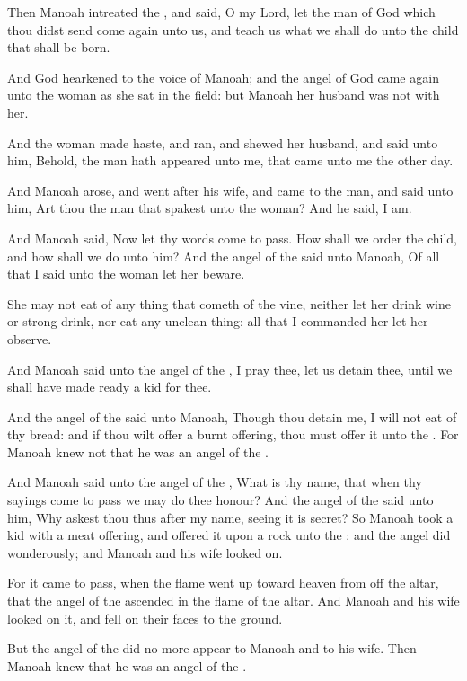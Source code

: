 \verse Then Manoah intreated the \LORD, and said, O my Lord, let the man of God which thou didst send come again unto us, and teach us what we shall do unto the child that shall be born.

\verse And God hearkened to the voice of Manoah; and the angel of God came again unto the woman as she sat in the field: but Manoah her husband was not with her.

\verse And the woman made haste, and ran, and shewed her husband, and said unto him, Behold, the man hath appeared unto me, that came unto me the other day.

\verse And Manoah arose, and went after his wife, and came to the man, and said unto him, Art thou the man that spakest unto the woman? And he said, I am.

\verse And Manoah said, Now let thy words come to pass. How shall we order the child, and how shall we do unto him?  \verse And the angel of the \LORD said unto Manoah, Of all that I said unto the woman let her beware.

\verse She may not eat of any thing that cometh of the vine, neither let her drink wine or strong drink, nor eat any unclean thing: all that I commanded her let her observe.

\verse And Manoah said unto the angel of the \LORD, I pray thee, let us detain thee, until we shall have made ready a kid for thee.

\verse And the angel of the \LORD said unto Manoah, Though thou detain me, I will not eat of thy bread: and if thou wilt offer a burnt offering, thou must offer it unto the \LORD. For Manoah knew not that he was an angel of the \LORD.

\verse And Manoah said unto the angel of the \LORD, What is thy name, that when thy sayings come to pass we may do thee honour?  \verse And the angel of the \LORD said unto him, Why askest thou thus after my name, seeing it is secret?  \verse So Manoah took a kid with a meat offering, and offered it upon a rock unto the \LORD: and the angel did wonderously; and Manoah and his wife looked on.

\verse For it came to pass, when the flame went up toward heaven from off the altar, that the angel of the \LORD ascended in the flame of the altar. And Manoah and his wife looked on it, and fell on their faces to the ground.

\verse But the angel of the \LORD did no more appear to Manoah and to his wife. Then Manoah knew that he was an angel of the \LORD.


